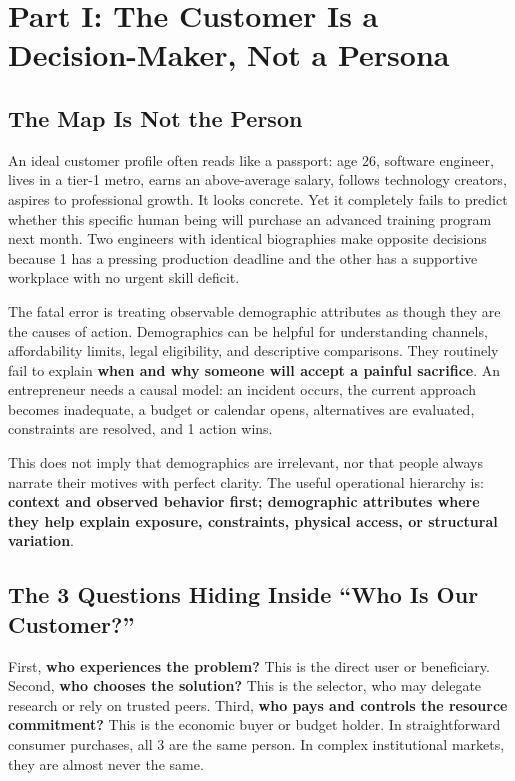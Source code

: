 \section{Part I: The Customer Is a Decision-Maker, Not a Persona}

\subsection{The Map Is Not the Person}

An ideal customer profile often reads like a passport: age 26, software engineer, lives in a tier-1 metro, earns an above-average salary, follows technology creators, aspires to professional growth. It looks concrete. Yet it completely fails to predict whether this specific human being will purchase an advanced training program next month. Two engineers with identical biographies make opposite decisions because 1 has a pressing production deadline and the other has a supportive workplace with no urgent skill deficit.

The fatal error is treating observable demographic attributes as though they are the causes of action. Demographics can be helpful for understanding channels, affordability limits, legal eligibility, and descriptive comparisons. They routinely fail to explain \textbf{when and why someone will accept a painful sacrifice}. An entrepreneur needs a causal model: an incident occurs, the current approach becomes inadequate, a budget or calendar opens, alternatives are evaluated, constraints are resolved, and 1 action wins.

This does not imply that demographics are irrelevant, nor that people always narrate their motives with perfect clarity. The useful operational hierarchy is: \textbf{context and observed behavior first; demographic attributes where they help explain exposure, constraints, physical access, or structural variation}.

\subsection{The 3 Questions Hiding Inside ``Who Is Our Customer?''}

First, \textbf{who experiences the problem?} This is the direct user or beneficiary. Second, \textbf{who chooses the solution?} This is the selector, who may delegate research or rely on trusted peers. Third, \textbf{who pays and controls the resource commitment?} This is the economic buyer or budget holder. In straightforward consumer purchases, all 3 are the same person. In complex institutional markets, they are almost never the same.


